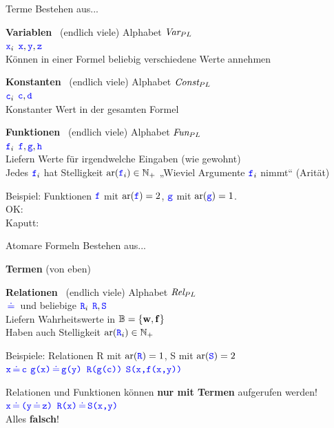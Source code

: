 \begin{frame}{Terme}
	Bestehen aus... \\
	\medskip
	
	\textbf{Variablen} \, (endlich viele) \quad Alphabet $\text{\itshape Var}_{PL}$ \\
	$\hbox{\textcolor{blue}{\texttt{x}}}_i$ \quad $\hbox{\textcolor{blue}{\texttt{x}}}, \hbox{\textcolor{blue}{\texttt{y}}}, \hbox{\textcolor{blue}{\texttt{z}}}$ \\
	Können in einer Formel beliebig verschiedene Werte annehmen \\
	\medskip \pause
	
	\textbf{Konstanten} \, (endlich viele) \quad Alphabet $\text{\itshape Const}_{PL}$ \\
	$\hbox{\textcolor{blue}{\texttt{c}}}_i$ \quad $\hbox{\textcolor{blue}{\texttt{c}}}, \hbox{\textcolor{blue}{\texttt{d}}}$ \\
	Konstanter Wert in der gesamten Formel \\
	\medskip \pause
	
	\textbf{Funktionen} \, (endlich viele) \quad Alphabet $\text{\itshape Fun}_{PL}$ \\
	$\hbox{\textcolor{blue}{\texttt{f}}}_i$ \quad $\hbox{\textcolor{blue}{\texttt{f}}}, \hbox{\textcolor{blue}{\texttt{g}}}, \hbox{\textcolor{blue}{\texttt{h}}}$ \\
	Liefern Werte für irgendwelche Eingaben (wie gewohnt) \\
	Jedes $\hbox{\textcolor{blue}{\texttt{f}}}_i$ hat Stelligkeit $\mathrm{ar}(\hbox{\textcolor{blue}{\texttt{f}}}_i) \in \mathbb{N}_+$ \quad „Wieviel Argumente $\hbox{\textcolor{blue}{\texttt{f}}}_i$ nimmt“ {\small (Arität)} \\
	\smallskip \pause
	
	\small Beispiel: 
	\quad Funktionen $\hbox{\textcolor{blue}{\texttt{f}}}$ mit $\mathrm{ar}(\hbox{\textcolor{blue}{\texttt{f}}}) = 2$, \quad $\hbox{\textcolor{blue}{\texttt{g}}}$ mit $\mathrm{ar}(\hbox{\textcolor{blue}{\texttt{g}}}) = 1$. \\ \pause
	\quad OK: \qquad {} \qquad {} \qquad {} \\
	\quad Kaputt: \qquad {} \qquad {} \qquad {} \qquad {}
\end{frame}

\begin{frame}{Atomare Formeln}
	Bestehen aus... \\
	\medskip
	
	\textbf{Termen} (von eben) \\
	\medskip
	
	\textbf{Relationen} \, (endlich viele) \quad Alphabet $\text{\itshape Rel}_{PL}$  \\
	$\pleq$ und beliebige $\hbox{\textcolor{blue}{\texttt{R}}}_i$ \quad $\hbox{\textcolor{blue}{\texttt{R}}}, \hbox{\textcolor{blue}{\texttt{S}}}$ \\
	Liefern Wahrheitswerte in $\mathbb{B} = \left\{ \hbox{\textbf{w}}, \hbox{\textbf{f}} \right\}$ \\
	Haben auch Stelligkeit $\mathrm{ar}(\hbox{\textcolor{blue}{\texttt{R}}}_i) \in \mathbb{N}_+$ \\
	\medskip \pause
	
	Beispiele: \quad Relationen \word R mit $\mathrm{ar}(\hbox{\textcolor{blue}{\texttt{R}}}) = 1$, \quad \word S mit $\mathrm{ar}(\hbox{\textcolor{blue}{\texttt{S}}}) = 2$ \\
	\quad $\word x \pleq \word c$ \qquad $\word{g(x)} \pleq \word{g(y)}$ \qquad $\hbox{\textcolor{blue}{\texttt{R(g(c))}}}$ \qquad $\hbox{\textcolor{blue}{\texttt{S(x,f(x,y))}}}$
	\medskip \pause
	
	Relationen und Funktionen können \textbf{nur mit Termen} aufgerufen werden! \\
	\impl \quad $\word x \pleq \word{(}\word y \pleq \word z\word{)}$ \qquad {} \qquad {} \qquad $\word{R(x)} \pleq \word{S(x,y)}$ \\
	Alles \textbf{falsch}!
\end{frame}

